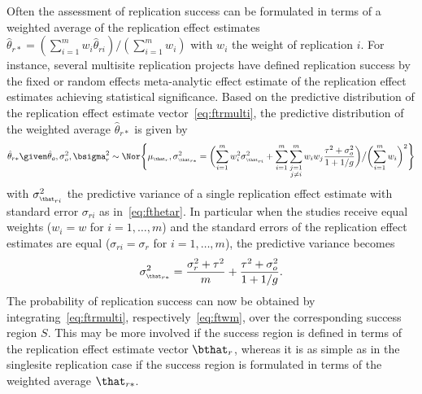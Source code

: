 Often the assessment of replication success can be formulated in terms of a
weighted average of the replication effect estimates
$\hat{\theta}_{r*} = (\sum_{i = 1}^{m} w_{i} \hat{\theta}_{ri})/(\sum_{i = 1}^{m} w_{i})$
with $w_{i}$ the weight of replication $i$. For instance, several multisite
replication projects \citep[\eg][]{Klein2018} have defined replication success
by the fixed or random effects meta-analytic effect estimate of the replication
effect estimates achieving statistical significance. Based on the predictive
distribution of the replication effect estimate vector~\eqref{eq:ftrmulti}, the
predictive distribution of the weighted average $\hat{\theta}_{r*}$ is given by
\begin{align}
  \hat{\theta}_{r*} \given \hat{\theta}_o, \sigma^{2}_{o}, \bsigma^{2}_{r}
  \sim \Nor\Biggl\{
  \mu_{\scriptscriptstyle \that_{r}},
  \sigma^{2}_{\scriptscriptstyle \that_{r*}} =
  \biggl(\sum_{i=1}^{m} w_{i}^{2} \sigma^{2}_{\scriptscriptstyle \that_{ri}} +
  \sum_{i=1}^{m}\sum_{\substack{j =1 \\ j\neq i}}^{m} w_{i}w_{j}
\frac{\tau^{2} + \sigma^{2}_{o}}{1 + 1/g} \biggr)\big/\biggl(\sum_{i=1}^{m} w_{i}\biggr)^{2} \Biggr\}
  \label{eq:ftwm}
\end{align}
with $\sigma^{2}_{\scriptscriptstyle \that_{ri}}$ the predictive variance of a
single replication effect estimate with standard error $\sigma_{ri}$ as
in~\eqref{eq:fthetar}. In particular when the studies receive equal weights
($w_{i} = w$ for $i = 1, \dots, m$) and the standard errors of the replication
effect estimates are equal ($\sigma_{ri} = \sigma_{r}$ for $i = 1, \dots, m$),
the predictive variance becomes
\begin{align}
  \sigma^{2}_{\scriptscriptstyle \that_{r*}} =
  \frac{\sigma^{2}_{r} + \tau^{2}}{m} + \frac{\tau^{2} + \sigma^{2}_{o}}{1 + 1/g}.
  \label{eq:predvarequal}
\end{align}
The probability of replication success can now be obtained by
integrating~\eqref{eq:ftrmulti}, respectively~\eqref{eq:ftwm}, over the
corresponding success region $S$. This may be more involved if the success
region is defined in terms of the replication effect estimate vector
$\bthat_{r}$, whereas it is as simple as in the singlesite replication case if
the success region is formulated in terms of the weighted average $\that_{r*}$.


